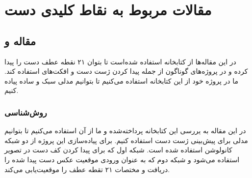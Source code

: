 \section{مقالات مربوط به نقاط کلیدی دست}

\subsection{مقاله  و }
در این مقاله‌ها از کتابخانه  استفاده‌ شده‌است تا بتوان ۲۱ نقطه عطف دست را پیدا کرده و در پروژه‌های گوناگون از جمله پیدا کردن ژست دست و افکت‌های  استفاده کند. ما در پروژه خود از این کتابخانه استفاده می‌کنیم تا بتوانیم مدلی سبک و ساده پیاده کنیم.

\subsubsection{روش‌شناسی}
 در این مقاله به یررسی این کتابخانه پرداخته‌شده و ما از آن استفاده می‌کنیم تا بتوانیم مدلی برای پیش‌بینی ژست دست استفاده کنیم.
برای پیاده‌سازی این پروژه از دو شبکه کانولوشن استفاده شده است. شبکه اول که برای پیدا کردن کف دست در تصویر استفاده می‌شود و شبکه دوم که به عنوان ورودی موقعیت عکس دست پیدا شده را دریافت و مختصات ۲۱ تقطه عطف را موقعیت‌یابی می‌کند.






